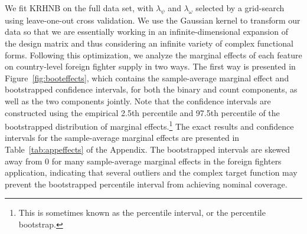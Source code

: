 \documentclass[12pt]{article}
\begin{document}
We fit KRHNB on the full data set, with $\lambda_{\psi}$ and $\lambda_{\omega}$ selected by a grid-search using leave-one-out cross validation. We use the Gaussian kernel to transform our data so that we are essentially working in an infinite-dimensional expansion of the design matrix and thus considering an infinite variety of complex functional forms. Following this optimization, we analyze the marginal effects of each feature on country-level foreign fighter supply in two ways. The first way is presented in Figure~\ref{fig:booteffects}, which contains the sample-average marginal effect and bootstrapped confidence intervals, for both the binary and count components, as well as the two components jointly. Note that the confidence intervals are constructed using the empirical 2.5th percentile and 97.5th percentile of the bootstrapped distribution of marginal effects.\footnote{This is sometimes known as the percentile interval, or the percentile bootstrap.} The exact results and confidence intervals for the sample-average marginal effects are presented in Table~\ref{tab:appeffects} of the Appendix. The bootstrapped intervals are skewed away from 0 for many sample-average marginal effects in the foreign fighters application, indicating that several outliers and the complex target function may prevent the bootstrapped percentile interval from achieving nominal coverage. \\
\end{document}
